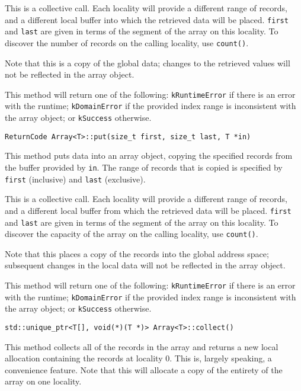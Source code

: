 This is a collective call. Each locality will provide a different range of
records, and a different local buffer into which the retrieved data will be
placed. \texttt{first} and \texttt{last} are given in terms of the segment of
the array on this locality. To discover the number of records on the calling
locality, use \texttt{count()}.

Note that this is a copy of the global data; changes to the retrieved values
will not be reflected in the array object.

This method will return one of the following: \texttt{kRuntimeError} if there
is an error with the runtime; \texttt{kDomainError} if the provided index range
is inconsistent with the array object; or \texttt{kSuccess} otherwise.

\begin{lstlisting}
ReturnCode Array<T>::put(size_t first, size_t last, T *in)
\end{lstlisting}

\noindent This method puts data into an array object, copying the specified
records from the buffer provided by \texttt{in}. The range of records that is
copied is specified by \texttt{first} (inclusive) and \texttt{last} (exclusive).

This is a collective call. Each locality will provide a different range of
records, and a different local buffer from which the retrieved data will be
placed. \texttt{first} and \texttt{last} are given in terms of the segment of
the array on this locality. To discover the capacity of the array on the
calling locality, use \texttt{count()}.

Note that this places a copy of the records into the global address space;
subsequent changes in the local data will not be reflected in the array object.

This method will return one of the following: \texttt{kRuntimeError} if there
is an error with the runtime; \texttt{kDomainError} if the provided index
range is inconsistent with the array object; or \texttt{kSuccess} otherwise.

\begin{lstlisting}
std::unique_ptr<T[], void(*)(T *)> Array<T>::collect()
\end{lstlisting}

\noindent This method collects all of the records in the array and returns a
new local allocation containing the records at locality 0. This is, largely
speaking, a convenience feature. Note that this will allocate a copy of the
entirety of the array on one locality.

